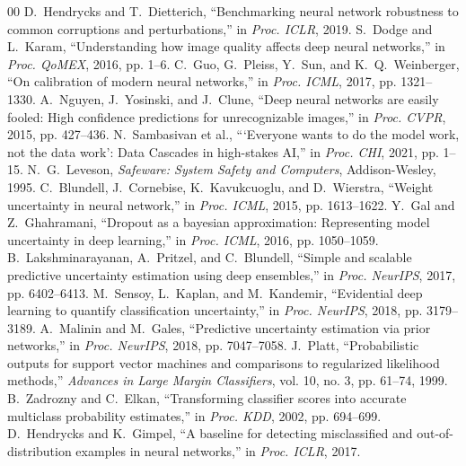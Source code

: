 \documentclass[conference]{IEEEtran}
\begin{document}
\begin{thebibliography}{00}
 D.~Hendrycks and T.~Dietterich, ``Benchmarking neural network robustness to common corruptions and perturbations,'' in \emph{Proc. ICLR}, 2019.
 S.~Dodge and L.~Karam, ``Understanding how image quality affects deep neural networks,'' in \emph{Proc. QoMEX}, 2016, pp. 1--6.
 C.~Guo, G.~Pleiss, Y.~Sun, and K.~Q.~Weinberger, ``On calibration of modern neural networks,'' in \emph{Proc. ICML}, 2017, pp. 1321--1330.
 A.~Nguyen, J.~Yosinski, and J.~Clune, ``Deep neural networks are easily fooled: High confidence predictions for unrecognizable images,'' in \emph{Proc. CVPR}, 2015, pp. 427--436.
 N.~Sambasivan et al., ```Everyone wants to do the model work, not the data work': Data Cascades in high-stakes AI,'' in \emph{Proc. CHI}, 2021, pp. 1--15.
 N.~G.~Leveson, \emph{Safeware: System Safety and Computers}, Addison-Wesley, 1995.
 C.~Blundell, J.~Cornebise, K.~Kavukcuoglu, and D.~Wierstra, ``Weight uncertainty in neural network,'' in \emph{Proc. ICML}, 2015, pp. 1613--1622.
 Y.~Gal and Z.~Ghahramani, ``Dropout as a bayesian approximation: Representing model uncertainty in deep learning,'' in \emph{Proc. ICML}, 2016, pp. 1050--1059.
 B.~Lakshminarayanan, A.~Pritzel, and C.~Blundell, ``Simple and scalable predictive uncertainty estimation using deep ensembles,'' in \emph{Proc. NeurIPS}, 2017, pp. 6402--6413.
 M.~Sensoy, L.~Kaplan, and M.~Kandemir, ``Evidential deep learning to quantify classification uncertainty,'' in \emph{Proc. NeurIPS}, 2018, pp. 3179--3189.
 A.~Malinin and M.~Gales, ``Predictive uncertainty estimation via prior networks,'' in \emph{Proc. NeurIPS}, 2018, pp. 7047--7058.
 J.~Platt, ``Probabilistic outputs for support vector machines and comparisons to regularized likelihood methods,'' \emph{Advances in Large Margin Classifiers}, vol. 10, no. 3, pp. 61--74, 1999.
 B.~Zadrozny and C.~Elkan, ``Transforming classifier scores into accurate multiclass probability estimates,'' in \emph{Proc. KDD}, 2002, pp. 694--699.
 D.~Hendrycks and K.~Gimpel, ``A baseline for detecting misclassified and out-of-distribution examples in neural networks,'' in \emph{Proc. ICLR}, 2017.

\end{thebibliography}
\end{document}
